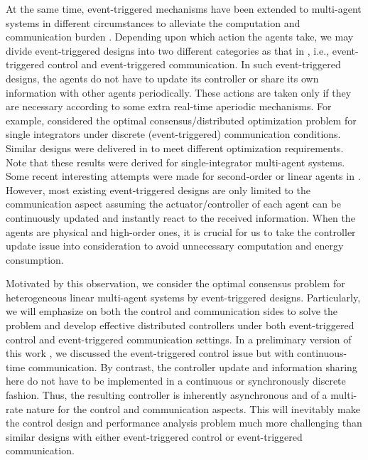 \documentclass[sort&compress]{IEEEtran}
\begin{document}
At the same time, event-triggered mechanisms have been extended to  multi-agent systems in different circumstances to alleviate the computation and communication burden \cite{heemels2012introduction, nowzari2019event}. Depending upon which action the agents take, we may divide event-triggered designs into two different categories as that in \cite{nowzari2019event}, i.e., event-triggered control and event-triggered communication.  In such event-triggered designs, the agents do not have to update its controller or share its own information with other agents periodically. These actions are taken only if they are necessary according to some extra real-time aperiodic mechanisms.  For example,  \cite{kia2015distributed} considered the optimal consensus/distributed optimization problem for single integrators under discrete (event-triggered) communication conditions.  Similar designs were delivered in \cite{liu2016event, deng2016distributed, kajiyama2018distributed, liu2019distributed, li2020distributed} to meet different optimization requirements. Note that these results were derived for single-integrator multi-agent systems. %
Some recent interesting attempts were made for second-order or linear agents in \cite{yi2018distributed, wang2018event, wang2019distributed, li2019distributed, yu2021new} . However, most existing event-triggered designs are only limited to the communication aspect assuming the actuator/controller of each agent can be continuously updated and instantly react to the received information. When the agents are physical and high-order ones, it is crucial for us to take the controller update issue into consideration to avoid unnecessary computation and energy consumption.   

Motivated by this observation, we consider the optimal consensus problem for heterogeneous linear multi-agent systems by event-triggered designs. Particularly, we will emphasize on both the control and communication sides to solve the problem and develop effective distributed controllers under both event-triggered control and event-triggered communication settings. In a preliminary version of this work \cite{tang2021ccc}, we discussed the event-triggered control issue but with continuous-time communication. By contrast, the controller update and information sharing here do not have to be implemented in a continuous or synchronously discrete fashion. Thus, the resulting controller is inherently asynchronous and of a multi-rate nature for the control and communication aspects. This will inevitably make the control design and performance analysis problem much more challenging than similar designs with either event-triggered control or event-triggered communication.  
\end{document}
